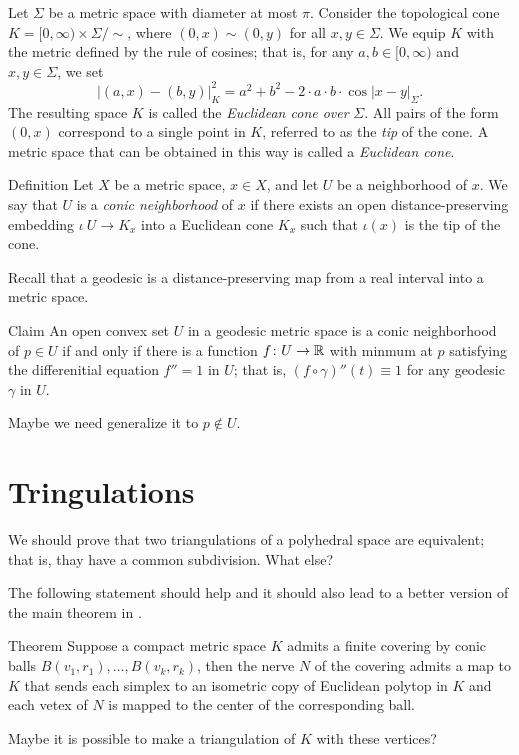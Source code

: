 \documentclass[a4paper,10pt]{article}
\begin{document}
Let $\Sigma$ be a metric space with diameter at most $\pi$.
Consider the topological cone
$K=[0,\infty)\times\Sigma/{\sim}$, where $(0,x)\sim(0,y)$ for all $x,y\in\Sigma$.
We equip $K$ with the metric defined by the rule of cosines;
that is, for any $a,b\in[0,\infty)$ and $x,y\in\Sigma$,
we set
$$|(a,x)-(b,y)|_K^2=a^2+b^2-2\cdot a\cdot b\cdot\cos |x-y|_\Sigma.$$
The resulting space $K$ is called the \emph{Euclidean cone over} $\Sigma$.
All pairs of the form $(0,x)$ correspond to a single point in $K$,
referred to as the \emph{tip} of the cone.
A metric space that can be obtained in this way is called a \emph{Euclidean cone}.


\begin{thm}{Definition}
Let $X$ be a metric space, $x\in X$, and let $U$ be a neighborhood of $x$.
We say that $U$ is a \emph{conic neighborhood} of $x$
if there exists an open distance-preserving embedding
$\iota \: U \to K_x$
into a Euclidean cone $K_x$
such that $\iota(x)$ is the tip of the cone.
\end{thm}

Recall that a geodesic is a distance-preserving map from a real interval into a metric space.

\begin{thm}{Claim}
An open convex set $U$ in a geodesic metric space is a conic neighborhood of $p\in U$ if and only if there is a function $f\colon U\to\mathbb{R}$ with minmum at $p$ satisfying the differenitial equation $f''=1$ in $U$;
that is, $(f\circ\gamma)''(t)\equiv 1$ for any geodesic $\gamma$ in $U$.
\end{thm}

Maybe we need generalize it to $p\notin U$.

\section{Tringulations}

We should prove that two triangulations of a polyhedral space are equivalent;
that is, thay have a common subdivision.
What else?

The following statement should help and it should also lead to a better version of the main theorem in \cite{lebedeva-petrunin}.

\begin{thm}{Theorem}
Suppose a compact metric space $K$ admits a finite covering by conic balls $B(v_1,r_1),\dots,B(v_k,r_k)$,
then the nerve $N$ of the covering admits a map to $K$ that sends each simplex to an isometric copy of Euclidean polytop in $K$ and each vetex of $N$ is mapped to the center of the corresponding ball.
\end{thm}

Maybe it is possible to make a triangulation of $K$ with these vertices?



{\sloppy
\printbibliography[heading=bibintoc]
\fussy
}
\end{document}

